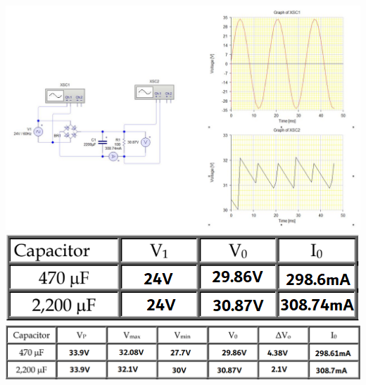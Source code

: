 \documentclass[12pt]{article}
\begin{document}
\begin{itemize}
\begin{enumerate}
\begin{center}
                \includegraphics*[scale=0.4]{sim9.jpg}
                \includegraphics*[scale=0.4]{medSimFBR3.png}
                \includegraphics*[scale=0.4]{medSimFBR4.png}
            \end{center}

        \end{enumerate}
        \newpage








\end{itemize}
\end{document}
